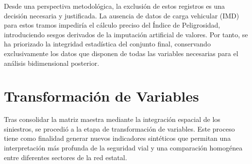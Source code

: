 \documentclass[twoside,a4paper,12pt,onecolumn,openany]{book}
\begin{document}
\begin{table}[htbp]
\centering
\caption{Carreteras con mayor número de accidentes sin coincidencia de vía (Nivel A, 2023)}
\label{tab:nivel_a_detalle}
\renewcommand{\arraystretch}{1.3}
\end{table}

\vspace{0,5cm}

Desde una perspectiva metodológica, la exclusión de estos registros es una decisión necesaria y justificada. La ausencia de datos de carga vehicular (IMD) para estos tramos impediría el cálculo preciso del Índice de Peligrosidad, introduciendo sesgos derivados de la imputación artificial de valores. Por tanto, se ha priorizado la integridad estadística del conjunto final, conservando exclusivamente los datos que disponen de todas las variables necesarias para el análisis bidimensional posterior.

\section{Transformación de Variables}

Tras consolidar la matriz maestra mediante la integración espacial de los siniestros, se procedió a la etapa de transformación de variables. Este proceso tiene como finalidad generar nuevos indicadores sintéticos que permitan una interpretación más profunda de la seguridad vial y una comparación homogénea entre diferentes sectores de la red estatal.
\end{document}
